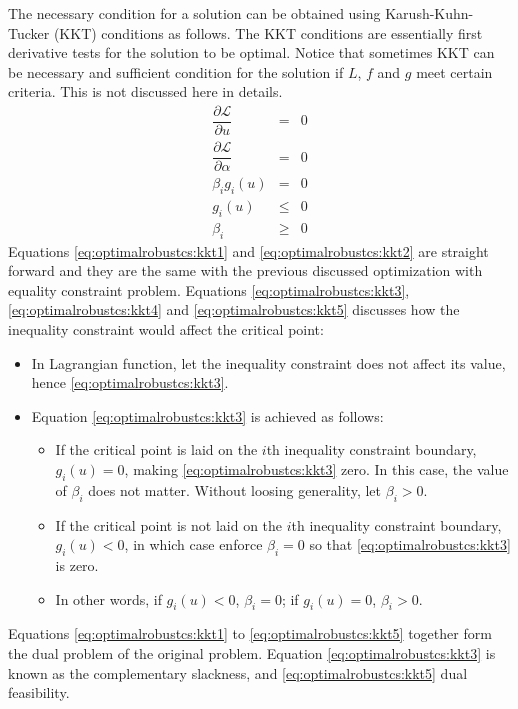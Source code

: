 The necessary condition for a solution can be obtained using Karush-Kuhn-Tucker (KKT) conditions as follows. The KKT conditions are essentially first derivative tests for the solution to be optimal. Notice that sometimes KKT can be necessary and sufficient condition for the solution if $L$, $f$ and $g$ meet certain criteria. This is not discussed here in details.
\begin{eqnarray}
  \dfrac{\partial \mathcal{L}}{\partial u} &=& 0 \label{eq:optimalrobustcs:kkt1} \\
  \dfrac{\partial \mathcal{L}}{\partial \alpha} &=& 0 \label{eq:optimalrobustcs:kkt2} \\
  \beta_i g_i(u) &=& 0 \label{eq:optimalrobustcs:kkt3} \\
  g_i(u) &\leq& 0 \label{eq:optimalrobustcs:kkt4} \\
  \beta_i &\geq& 0 \label{eq:optimalrobustcs:kkt5}
\end{eqnarray}
Equations \eqref{eq:optimalrobustcs:kkt1} and \eqref{eq:optimalrobustcs:kkt2} are straight forward and they are the same with the previous discussed optimization with equality constraint problem. Equations \eqref{eq:optimalrobustcs:kkt3}, \eqref{eq:optimalrobustcs:kkt4} and \eqref{eq:optimalrobustcs:kkt5} discusses how the inequality constraint would affect the critical point:
\begin{itemize}
  \item In Lagrangian function, let the inequality constraint does not affect its value, hence \eqref{eq:optimalrobustcs:kkt3}.
  \item Equation \eqref{eq:optimalrobustcs:kkt3} is achieved as follows:
  \begin{itemize}
    \item If the critical point is laid on the $i$th inequality constraint boundary, $g_i(u)=0$, making \eqref{eq:optimalrobustcs:kkt3} zero. In this case, the value of $\beta_i$ does not matter. Without loosing generality, let $\beta_i>0$.
    \item If the critical point is not laid on the $i$th inequality constraint boundary, $g_i(u)<0$, in which case enforce $\beta_i=0$ so that \eqref{eq:optimalrobustcs:kkt3} is zero.
    \item In other words, if $g_i(u)<0$, $\beta_i=0$; if $g_i(u)=0$, $\beta_i>0$.
  \end{itemize}
\end{itemize}

Equations \eqref{eq:optimalrobustcs:kkt1} to \eqref{eq:optimalrobustcs:kkt5} together form the dual problem of the original problem. Equation \eqref{eq:optimalrobustcs:kkt3} is known as the complementary slackness, and \eqref{eq:optimalrobustcs:kkt5} dual feasibility.

